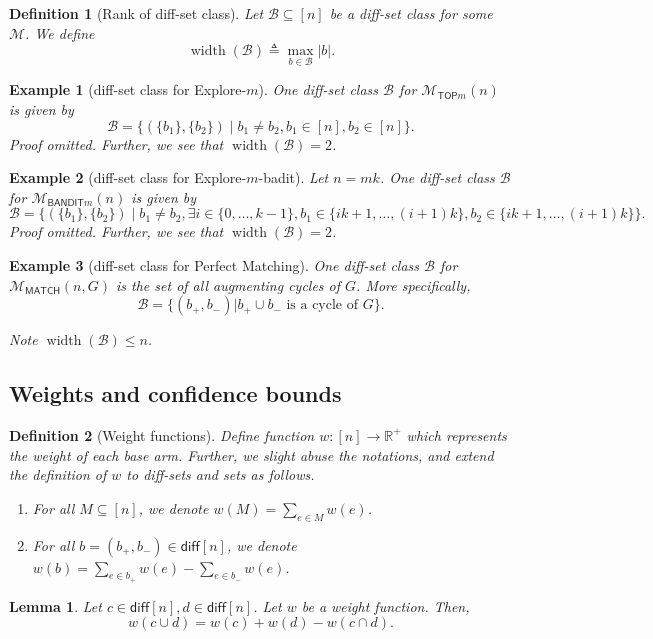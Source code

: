 \documentclass{article}
\newtheorem{define}{Definition}
\newtheorem{example}{Example}
\newtheorem{lemma}{Lemma}
\newcommand{\M}{\mathcal M}
\newcommand{\mmatch}{\mathcal M_{\mathsf{MATCH}}}
\newcommand{\mtop}{\mathcal M_{\mathsf{TOP}m}}
\newcommand{\mbandit}{\mathcal M_{\mathsf{BANDIT}m}}
\newcommand{\diff}{\mathsf{diff}}
\newcommand{\B}{\mathcal B}
\newcommand{\RR}{\mathbb R}
\DeclareMathOperator{\rank}{width}
\begin{document}
\begin{spacing}{1.1}
\begin{define}[Rank of diff-set class]
Let $\B \subseteq [n]$ be a diff-set class for some $\M$. We define
$$
\rank(\B) \triangleq \max_{b \in \B} |b|.
$$
\end{define}

\begin{example}[diff-set class for Explore-$m$]
One diff-set class $\B$ for $\mtop(n)$ is given by
$$
\B=\{(\{b_1\},\{b_2\}) \;|\; b_1\not=b_2, b_1\in[n], b_2\in[n]\}.
$$
Proof omitted.
Further, we see that $\rank(\B)=2$.
\end{example}

\begin{example}[diff-set class for Explore-$m$-badit]
Let $n=mk$.
One diff-set class $\B$ for $\mbandit(n)$ is given by
$$
\B=\{(\{b_1\},\{b_2\}) \;|\; b_1\not=b_2, \exists i\in\{0,\ldots,k-1\}, b_1\in \{ik+1,\ldots, (i+1)k\}, b_2\in\{ik+1,\ldots, (i+1)k\}\}.
$$
Proof omitted.
Further, we see that $\rank(\B)=2$.
\end{example}


\begin{example}[diff-set class for Perfect Matching]
One diff-set class $\B$ for $\mmatch(n, G)$ is the set of all augmenting cycles of $G$. 
More specifically,
$$
\B=\{(b_+,b_-) | b_+\cup b_- \text{ is a cycle of } G\}.
$$

Note $\rank(\B)\le n$.
\end{example}

\subsection{Weights and confidence bounds}

\begin{define}[Weight functions]
Define function $w: [n] \rightarrow \RR^+$ which represents the weight of each base arm. 
Further, we slight abuse the notations, and extend the definition of $w$ to diff-sets and sets as follows.
\begin{enumerate}
\item For all $M \subseteq [n]$, we denote $w(M) = \sum_{e\in M} w(e)$.
\item For all $b=(b_+,b_-) \in \diff[n]$, we denote $w(b) = \sum_{e\in b_+} w(e)-\sum_{e\in b_-}w(e)$.
\end{enumerate}
\end{define}


\begin{lemma}
\label{lemma:weight-diff-simple}
Let $c\in \diff[n],d\in \diff[n]$. Let $w$ be a weight function.
Then,
\begin{equation}
w(c\cup d) = w(c)+w(d)-w(c\cap d).
\end{equation}
\end{lemma}


\end{spacing}
\end{document}
